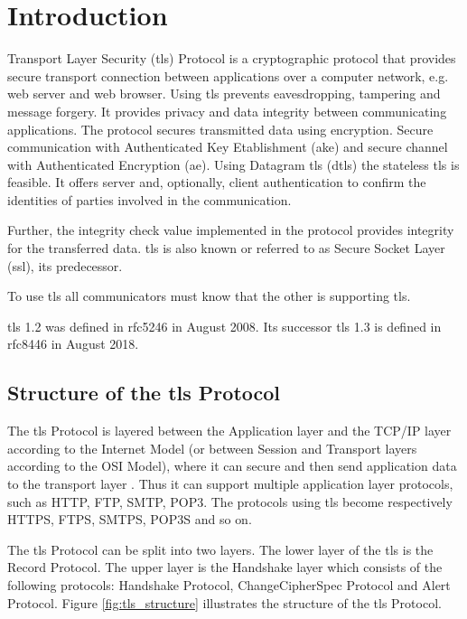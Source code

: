 \chapter{Introduction}
\label{chap:introduction}

Transport Layer Security (\gls{tls}) Protocol is a cryptographic protocol that provides secure transport connection between applications over a computer network, e.g. web server and web browser. 
Using \gls{tls} prevents eavesdropping, tampering and message forgery. It provides privacy and data integrity between communicating applications. The protocol secures transmitted data using encryption. Secure communication with Authenticated Key Etablishment (\gls{ake}) and secure channel with Authenticated Encryption (\gls{ae}). 
Using Datagram \gls{tls} (\gls{dtls}) the stateless \gls{tls} is feasible. It offers server and, optionally, client authentication to confirm the identities of parties involved in the communication. 
 
Further, the integrity check value implemented in the protocol provides integrity for the transferred data. \gls{tls} is also known or referred to as Secure Socket Layer (\gls{ssl}), its predecessor. 
 
To use \gls{tls} all communicators must know that the other is supporting \gls{tls}.

\gls{tls} 1.2 was defined in \gls{rfc}5246 in August 2008. Its successor \gls{tls} 1.3 is defined in \gls{rfc}8446 in August 2018.
 \cite{RFC5246}\cite{ms:overview}

\section{Structure of the \gls{tls} Protocol}
\label{sec:stucture}

The \gls{tls} Protocol is layered between the Application layer and the TCP/IP layer according to the Internet Model (or between Session and Transport layers according to the OSI Model), where it can secure and then send application data to the transport layer \cite{ms:overview}. Thus it can support multiple application layer protocols, such as HTTP, FTP, SMTP, POP3. The protocols using \gls{tls} become respectively HTTPS, FTPS, SMTPS, POP3S and so on.

The \gls{tls} Protocol can be split into two layers. The lower layer of the \gls{tls} is the Record Protocol. The upper layer is the Handshake layer which consists of the following protocols: Handshake Protocol, ChangeCipherSpec Protocol and Alert Protocol. Figure \ref{fig:tls_structure} illustrates the structure of the \gls{tls} Protocol. 
\cite{tlsstrukt}

